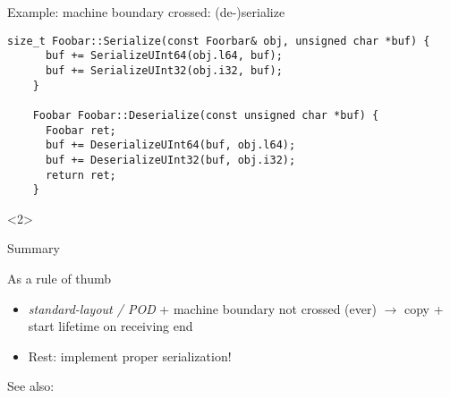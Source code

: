 \begin{frame}[fragile]{Example: machine boundary crossed: (de-)serialize}
  \begin{lstlisting}[style=c++]
    size_t Foobar::Serialize(const Foorbar& obj, unsigned char *buf) {
      buf += SerializeUInt64(obj.l64, buf);
      buf += SerializeUInt32(obj.i32, buf);
    }

    Foobar Foobar::Deserialize(const unsigned char *buf) {
      Foobar ret;
      buf += DeserializeUInt64(buf, obj.l64);
      buf += DeserializeUInt32(buf, obj.i32);
      return ret;
    }
  \end{lstlisting}

  \begin{onlyenv}<2>
  \end{onlyenv}
\end{frame}

\begin{frame}{Summary}
  \begin{block}{As a rule of thumb}
    \begin{itemize}
      \itemsep=1em
    \item \textit{standard-layout / POD} + machine boundary not crossed (ever) $\rightarrow$ copy + start lifetime on receiving end

    \item Rest: implement proper serialization!
    \end{itemize}
  \end{block}

  \vfill
  See also: 
\end{frame}
